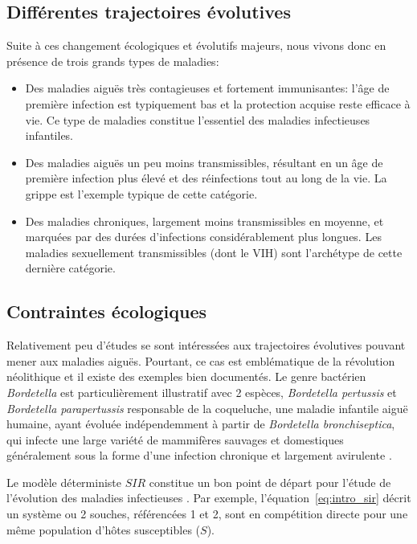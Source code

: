 \subsection{Différentes trajectoires évolutives}

Suite à ces changement écologiques et évolutifs majeurs, nous vivons
donc en présence de trois grands types de maladies:

\begin{itemize}
\item Des maladies aiguës très contagieuses et fortement immunisantes:
  l'âge de première infection est typiquement bas \citep{Anderson1992}
  et la protection acquise reste efficace à vie. Ce type de maladies
  constitue l'essentiel des maladies infectieuses infantiles.
\item Des maladies aiguës un peu moins transmissibles, résultant en un
  âge de première infection plus élevé et des réinfections tout au
  long de la vie. La grippe est l'exemple typique de cette catégorie.
\item Des maladies chroniques, largement moins transmissibles en
  moyenne, et marquées par des durées d'infections considérablement
  plus longues. Les maladies sexuellement transmissibles (dont le VIH)
  sont l'archétype de cette dernière catégorie.
\end{itemize}



\subsection{Contraintes écologiques}


Relativement peu d'études se sont intéressées aux trajectoires
évolutives pouvant mener aux maladies aiguës.  Pourtant, ce cas est
emblématique de la révolution néolithique et il existe des exemples
bien documentés. Le genre bactérien \textit{Bordetella} est
particulièrement illustratif avec 2 espèces, \textit{Bordetella
  pertussis} et \textit{Bordetella parapertussis} responsable de la
coqueluche, une maladie infantile aiguë humaine, ayant évoluée
indépendemment à partir de \textit{Bordetella bronchiseptica}, qui
infecte une large variété de mammifères sauvages et domestiques
généralement sous la forme d'une infection chronique et largement
avirulente \citep{Bjoernstad2005}.

Le modèle déterministe $SIR$ constitue un bon point de départ pour
l'étude de l'évolution des maladies infectieuses
\citep{Dieckmann2002}.  Par exemple, l'équation~\eqref{eq:intro_sir}
décrit un système ou 2 souches, référencées 1 et 2, sont en
compétition directe pour une même population d'hôtes susceptibles
($S$).

